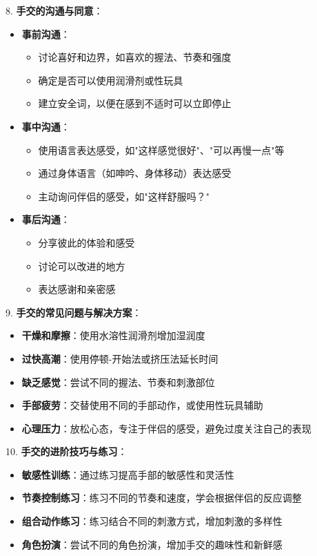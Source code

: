 \documentclass[12pt,UTF8]{ctexbook}
\begin{document}
8. \textbf{手交的沟通与同意}：
\begin{itemize}
	\item \textbf{事前沟通}：
	\begin{itemize}
		\item 讨论喜好和边界，如喜欢的握法、节奏和强度
		\item 确定是否可以使用润滑剂或性玩具
		\item 建立安全词，以便在感到不适时可以立即停止
	\end{itemize}
	\item \textbf{事中沟通}：
	\begin{itemize}
		\item 使用语言表达感受，如"这样感觉很好"、"可以再慢一点"等
		\item 通过身体语言（如呻吟、身体移动）表达感受
		\item 主动询问伴侣的感受，如"这样舒服吗？"
	\end{itemize}
	\item \textbf{事后沟通}：
	\begin{itemize}
		\item 分享彼此的体验和感受
		\item 讨论可以改进的地方
		\item 表达感谢和亲密感
	\end{itemize}
\end{itemize}

9. \textbf{手交的常见问题与解决方案}：
\begin{itemize}
	\item \textbf{干燥和摩擦}：使用水溶性润滑剂增加湿润度
	\item \textbf{过快高潮}：使用停顿-开始法或挤压法延长时间
	\item \textbf{缺乏感觉}：尝试不同的握法、节奏和刺激部位
	\item \textbf{手部疲劳}：交替使用不同的手部动作，或使用性玩具辅助
	\item \textbf{心理压力}：放松心态，专注于伴侣的感受，避免过度关注自己的表现
\end{itemize}

10. \textbf{手交的进阶技巧与练习}：
\begin{itemize}
	\item \textbf{敏感性训练}：通过练习提高手部的敏感性和灵活性
	\item \textbf{节奏控制练习}：练习不同的节奏和速度，学会根据伴侣的反应调整
	\item \textbf{组合动作练习}：练习结合不同的刺激方式，增加刺激的多样性
	\item \textbf{角色扮演}：尝试不同的角色扮演，增加手交的趣味性和新鲜感
\end{itemize}
\end{document}
